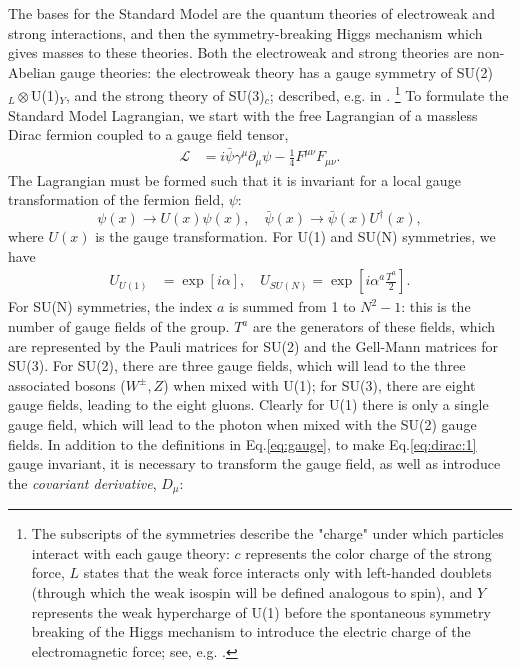 \documentclass[a4paper,12pt]{article}
\begin{document}
The bases for the Standard Model are the quantum theories of electroweak and strong interactions, and then the symmetry-breaking Higgs mechanism which gives masses to these theories.
Both the electroweak and strong theories are non-Abelian gauge theories: the electroweak theory has a gauge symmetry of SU(2)$_{L}\otimes$U(1)$_Y$, and the strong theory of SU(3)$_{c}$; described, e.g. in \cite{bail}.
\hspace{-9pt}\footnote{The subscripts of the symmetries describe the "charge" under which particles interact with each gauge theory: $c$ represents the color charge of the strong force, $L$ states that the weak force interacts only with left-handed doublets (through which the weak isospin will be defined analogous to spin), and $Y$ represents the weak hypercharge of U(1) before the spontaneous symmetry breaking of the Higgs mechanism to introduce the electric charge of the electromagnetic force; see, e.g. \cite{schwartz}.}
\hspace{-5pt}To formulate the Standard Model Lagrangian, we start with the free Lagrangian of a massless Dirac fermion coupled to a gauge field tensor,
\begin{align}
    \label{eq:dirac:1}
    \mathcal{L} &= i\bar{\psi}\gamma^\mu\partial_\mu\psi - \frac14F^{\mu\nu}F_{\mu\nu}.
\end{align}
The Lagrangian must be formed such that it is invariant for a local gauge transformation of the fermion field, $\psi$:
\begin{equation}
    \label{eq:local}
    \psi(x)\to U(x)\psi(x),\quad \bar{\psi}(x)\to\bar{\psi}(x)U^\dagger(x),
\end{equation}
where $U(x)$ is the gauge transformation.
For U(1) and SU(N) symmetries, we have
\begin{align}
    \label{eq:gauge} 
    U_{U(1)} &= \exp\left[i\alpha\right],\quad U_{SU(N)} = \exp\left[i\alpha^a\frac{T^a}{2}\right].
\end{align}
For SU(N) symmetries, the index $a$ is summed from 1 to $N^2-1$: this is the number of gauge fields of the group.
$T^a$ are the generators of these fields, which are represented by the Pauli matrices for SU(2) and the Gell-Mann matrices for SU(3).
For SU(2), there are three gauge fields, which will lead to the three associated bosons ($W^{\pm},Z$) when mixed with U(1); for SU(3), there are eight gauge fields, leading to the eight gluons.
Clearly for U(1) there is only a single gauge field, which will lead to the photon when mixed with the SU(2) gauge fields.
In addition to the definitions in Eq.\eqref{eq:gauge}, to make Eq.\eqref{eq:dirac:1} gauge invariant, it is necessary to transform the gauge field, as well as introduce the \textit{covariant derivative}, $D_\mu$:
\end{document}
